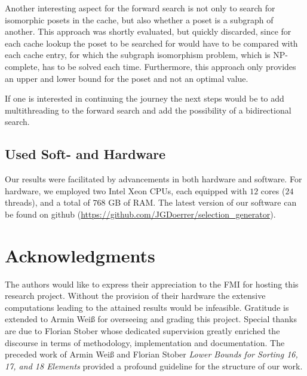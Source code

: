 \documentclass[10pt,journal,compsoc]{IEEEtran}
\begin{document}
Another interesting aspect for the forward search is not only to search for isomorphic posets in the cache, but also whether a poset is a subgraph of another.
This approach was shortly evaluated, but quickly discarded, since for each cache lookup the poset to be searched for would have to be compared with each cache entry, for which the subgraph isomorphism problem, which is NP-complete, has to be solved each time.
Furthermore, this approach only provides an upper and lower bound for the poset and not an optimal value.

If one is interested in continuing the journey the next steps would be to add multithreading to the forward search and add the possibility of a
bidirectional search.


\subsection{Used Soft- and Hardware} \label{sec:hardware}

Our results were facilitated by advancements in both hardware and software.
For hardware, we employed two Intel Xeon CPUs, each equipped with $12$ cores ($24$ threads), and a total of $768$ GB of RAM. %
The latest version of our software can be found on github (\url{https://github.com/JGDoerrer/selection_generator}).





\section*{Acknowledgments}

The authors would like to express their appreciation to the FMI for hosting this research project.
Without the provision of their hardware the extensive computations leading to the attained results would be infeasible.
Gratitude is extended to Armin Weiß for overseeing and grading this project.
Special thanks are due to Florian Stober whose dedicated supervision greatly enriched the discourse in terms of methodology, implementation and documentation.
The preceded work of Armin Weiß and Florian Stober \textit{Lower Bounds for Sorting 16, 17, and 18 Elements} \cite{stober2022lower} provided a profound guideline for the structure of our work.

\ifCLASSOPTIONcaptionsoff
  \newpage
\fi




\end{document}
